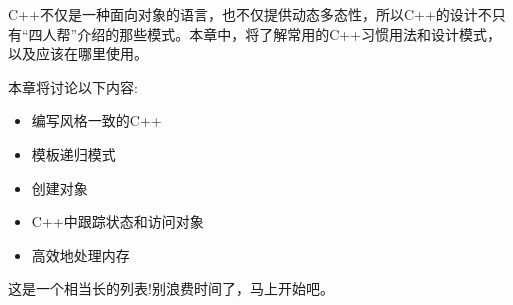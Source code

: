 
C++不仅是一种面向对象的语言，也不仅提供动态多态性，所以C++的设计不只有“四人帮”介绍的那些模式。本章中，将了解常用的C++习惯用法和设计模式，以及应该在哪里使用。

本章将讨论以下内容:

\begin{itemize}
\item 编写风格一致的C++
\item 模板递归模式
\item 创建对象
\item C++中跟踪状态和访问对象
\item 高效地处理内存
\end{itemize}

这是一个相当长的列表!别浪费时间了，马上开始吧。